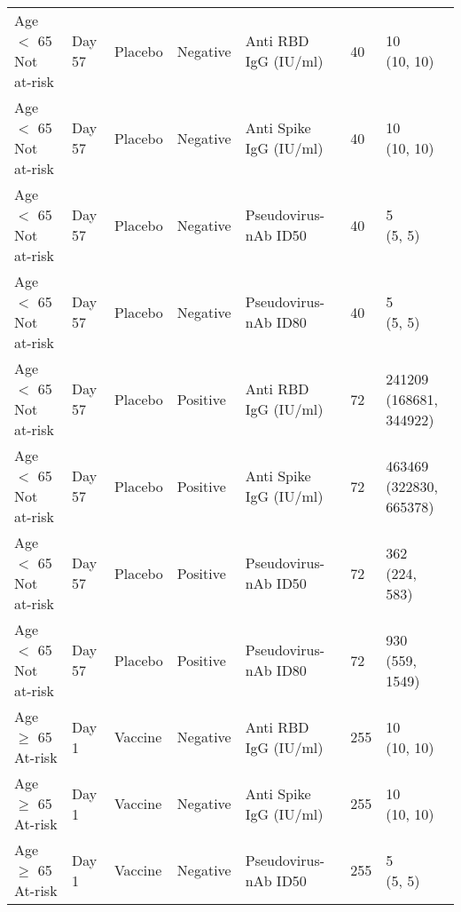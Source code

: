 \documentclass[]{book}
\theoremstyle{definition}
\theoremstyle{definition}
\theoremstyle{definition}
\newcommand{\1}{\mathbbm{1}}
\begin{document}
\begin{landscape}
\begin{ThreePartTable}
\begin{longtable}[t]{>{\raggedright\arraybackslash}p{7cm}llllll}
\hspace{1em}Age $<$ 65 Not at-risk & Day 57 & Placebo & Negative & Anti RBD IgG (IU/ml) & 40 & \makecell[l]{10\\(10, 10)}\\
\hspace{1em}Age $<$ 65 Not at-risk & Day 57 & Placebo & Negative & Anti Spike IgG (IU/ml) & 40 & \makecell[l]{10\\(10, 10)}\\
\hspace{1em}Age $<$ 65 Not at-risk & Day 57 & Placebo & Negative & Pseudovirus-nAb ID50 & 40 & \makecell[l]{5\\(5, 5)}\\
\hspace{1em}Age $<$ 65 Not at-risk & Day 57 & Placebo & Negative & Pseudovirus-nAb ID80 & 40 & \makecell[l]{5\\(5, 5)}\\
\hspace{1em}Age $<$ 65 Not at-risk & Day 57 & Placebo & Positive & Anti RBD IgG (IU/ml) & 72 & \makecell[l]{241209\\(168681, 344922)}\\
\hspace{1em}Age $<$ 65 Not at-risk & Day 57 & Placebo & Positive & Anti Spike IgG (IU/ml) & 72 & \makecell[l]{463469\\(322830, 665378)}\\
\hspace{1em}Age $<$ 65 Not at-risk & Day 57 & Placebo & Positive & Pseudovirus-nAb ID50 & 72 & \makecell[l]{362\\(224, 583)}\\
\hspace{1em}Age $<$ 65 Not at-risk & Day 57 & Placebo & Positive & Pseudovirus-nAb ID80 & 72 & \makecell[l]{930\\(559, 1549)}\\
\hspace{1em}Age $\geq$ 65 At-risk & Day 1 & Vaccine & Negative & Anti RBD IgG (IU/ml) & 255 & \makecell[l]{10\\(10, 10)}\\
\hspace{1em}Age $\geq$ 65 At-risk & Day 1 & Vaccine & Negative & Anti Spike IgG (IU/ml) & 255 & \makecell[l]{10\\(10, 10)}\\
\hspace{1em}Age $\geq$ 65 At-risk & Day 1 & Vaccine & Negative & Pseudovirus-nAb ID50 & 255 & \makecell[l]{5\\(5, 5)}\\

\end{longtable}
\end{ThreePartTable}
\end{landscape}
\end{document}
